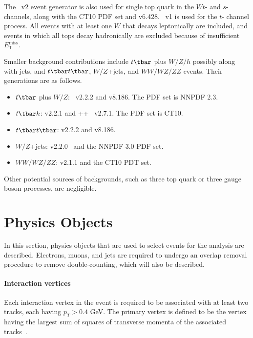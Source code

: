 The \POWHEGBOX~v2 event generator is also used for single top quark in the
$Wt$- and $s$- channels, along with the CT10 PDF set and \PYTHIA v6.428.
\POWHEGBOX~v1 is used for the $t$- channel process. All events with at least
one $W$ that decays leptonically are included, and events in which all tops
decay hadronically are excluded because of insufficient
$E_{\text{T}}^{\text{miss}}$.

Smaller background contributions include $t\tbar$ plus $W/Z/h$ possibly along
with jets, and $t\tbar t\tbar$, $W/Z$+jets, and $WW/WZ/ZZ$ events. Their
generations are as follows.

\begin{itemize}[label=]

	\item $t\tbar$ plus $W/Z$: \MGMCatNLO~v2.2.2 and \PYTHIA v8.186. The PDF set is
	      NNPDF 2.3.

	\item $t\tbar h$: \MGMCatNLO v2.2.1 and \MYHERWIG++~\cite{Bahr:2008pv} v2.7.1.
	      The PDF set is CT10.

	\item $t\tbar t\tbar$: \MGMCatNLO v2.2.2 and \PYTHIA v8.186.

	\item $W/Z$+jets: \SHERPA v2.2.0~\cite{Gleisberg:2008ta} and the NNPDF 3.0 PDF
	      set.

	\item $WW/WZ/ZZ$: \SHERPA v2.1.1 and the CT10 PDT set.
\end{itemize}

Other potential sources of backgrounds, such as three top quark or three gauge
boson processes, are negligible.

\section{Physics Objects}\label{mbobjs}

In this section, physics objects that are used to select events for the
analysis are described. Electrons, muons, and jets are required to undergo an
overlap removal procedure to remove double-counting, which will also be
described.

\paragraph{Interaction vertices} Each interaction vertex in the event is
required to be associated with at least two tracks, each having $p_T > 0.4$
GeV. The primary vertex is defined to be the vertex having the largest sum of
squares of transverse momenta of the associated
tracks~\cite{ATL-PHYS-PUB-2015-026}.

